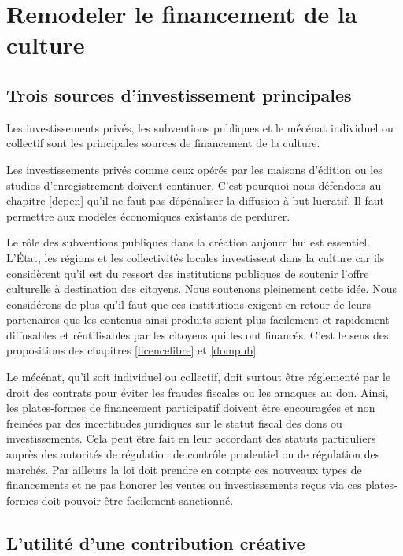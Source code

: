 \chapter{Remodeler le financement de la culture}\label{financement}

\section{Trois sources d'investissement principales}
Les investissements privés, les subventions publiques et le mécénat individuel ou collectif sont les principales sources de financement de la culture.

Les investissements privés comme ceux opérés par les maisons d'édition ou les studios d'enregistrement doivent continuer. C'est pourquoi nous défendons au chapitre \ref{depen} qu'il ne faut pas dépénaliser la diffusion à but lucratif. Il faut permettre aux modèles économiques existants de perdurer.

Le rôle des subventions publiques dans la création aujourd'hui est essentiel. L'État, les régions et les collectivités locales investissent dans la culture car ils considèrent qu'il est du ressort des institutions publiques de soutenir l'offre culturelle à destination des citoyens. Nous soutenons pleinement cette idée. Nous considérons de plus qu'il faut que ces institutions exigent en retour de leurs partenaires que les contenus ainsi produits soient plus facilement et rapidement diffusables et réutilisables par les citoyens qui les ont financés. C'est le sens des propositions des chapitres \ref{licencelibre} et \ref{dompub}. 

Le mécénat, qu'il soit individuel ou collectif, doit surtout être réglementé par le droit des contrats pour éviter les fraudes fiscales ou les arnaques au don. Ainsi, les plates-formes de financement participatif doivent être encouragées et non freinées par des incertitudes juridiques sur le statut fiscal des dons ou investissements. Cela peut être fait en leur accordant des statuts particuliers auprès des autorités de régulation de contrôle prudentiel ou de régulation des marchés. Par ailleurs la loi doit prendre en compte ces nouveaux types de financements et ne pas honorer les ventes ou investissements reçus via ces plates-formes doit pouvoir être facilement sanctionné. 

\section{L'utilité d'une contribution créative}

